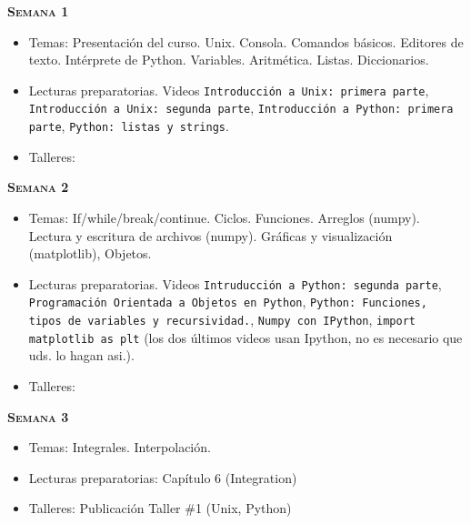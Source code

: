\documentclass[letterpaper,10pt,onecolumn]{article}
\begin{document}
\noindent\textbf{\textsc{Semana 1}}\\[-0.5cm]
\begin{itemize}
\item Temas: 
Presentaci\'on del curso. Unix. Consola. Comandos b\'asicos. Editores
de texto. Int\'erprete de
Python. Variables. Aritm\'etica. Listas. Diccionarios.\\[-0.6cm] 
\item Lecturas preparatorias. Videos \texttt{Introducci\'on a Unix:
  primera parte}, \texttt{Introducci\'on a Unix: segunda parte},
  \texttt{Introducci\'on a Python: primera parte}, \texttt{Python:
    listas y strings}.\\[-0.6cm] 
\item Talleres: 
\\[-0.6cm]
\end{itemize}

\noindent\textbf{\textsc{Semana 2}}\\[-0.5cm]
\begin{itemize}
\item Temas: If/while/break/continue. Ciclos. Funciones. Arreglos
(numpy). Lectura y escritura de archivos (numpy). Gr\'aficas y
visualizaci\'on (matplotlib), Objetos. \\[-0.6cm]
\item Lecturas preparatorias. Videos \texttt{Intruducci\'on a Python:
  segunda parte}, \texttt{Programaci\'on Orientada a Objetos en
  Python}, \texttt{Python: Funciones, tipos de
  variables y recursividad.}, \texttt{Numpy con IPython}, 
  \texttt{import matplotlib as plt} (los dos \'ultimos videos usan
  Ipython, no es necesario que uds. lo hagan asi.). \\[-0.6cm] 
\item Talleres: \\[-0.6cm]
\end{itemize}


\noindent\textbf{\textsc{Semana 3}}\\[-0.5cm]
\begin{itemize}
\item Temas: Integrales. Interpolaci\'on. \\[-0.6cm]
\item Lecturas preparatorias: Cap\'itulo 6 (Integration) \\[-0.6cm]
\item Talleres: 
Publicaci\'on Taller \#1 (Unix, Python)\\[-0.6cm] 
\end{itemize}
\end{document}
